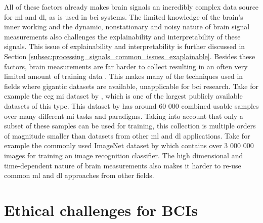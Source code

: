 All of these factors already makes brain signals an incredibly complex data source for \gls{ml} and \gls{dl}, as is used in \gls{bci} systems.
The limited knowledge of the brain's inner working and the dynamic, nonstationary and noisy nature of brain signal measurements also challenges the explainability and interpretability of these signals.
This issue of explainability and interpretability is further discussed in Section \ref{subsec:processing_signals_common_issues_exaplainable}.
Besides these factors, brain measurements are far harder to collect resulting in an often very limited amount of training data \citep{bci_applications}.
This makes many of the techniques used in fields where gigantic datasets are available, unapplicable for \gls{bci} research.
Take for example the \gls{eeg} \gls{mi} dataset by \citet{eeg_data}, which is one of the largest publicly available datasets of this type.
This dataset by \citet{eeg_data} has around 60 000 combined usable samples over many different \gls{mi} tasks and paradigms.
Taking into account that only a subset of these samples can be used for training, this collection is multiple orders of magnitude smaller than datasets from other \gls{ml} and \gls{dl} applications.
Take for example the commonly used ImageNet dataset by \citet{imagenet} which contains over 3 000 000 images for training an image recognition classifier.
The high dimensional and time-dependent nature of brain measurements also makes it harder to re-use common \gls{ml} and \gls{dl} approaches from other fields.



 





\section{Ethical challenges for BCIs}
\label{sec:bci_ethical}



